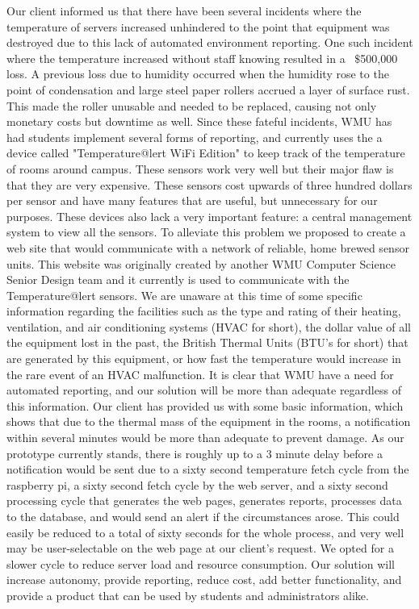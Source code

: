 \documentclass{report}
\begin{document}
\newline
\indent
Our client informed us that there have been several incidents where the temperature of servers increased unhindered to the point that equipment was destroyed due to this lack of automated environment reporting. One such incident where the temperature increased without staff knowing resulted in a ~$\$$500,000 loss. A previous loss due to humidity occurred when the humidity rose to the point of condensation and large steel paper rollers accrued a layer of surface rust. This made the roller unusable and needed to be replaced, causing not only monetary costs but downtime as well.
\newline
\indent
Since these fateful incidents, WMU has had students implement several forms of reporting, and currently uses the a device called "Temperature@lert WiFi Edition" to keep track of the temperature of rooms around campus. These sensors work very well but their major flaw is that they are very expensive. These sensors cost upwards of three hundred dollars per sensor and have many features that are useful, but unnecessary for our purposes. These devices also lack a very important feature: a central management system to view all the sensors. To alleviate this problem we proposed to create a web site that would communicate with a network of reliable, home brewed sensor units. This website was originally created by another WMU Computer Science Senior Design team and it currently is used to communicate with the Temperature@lert sensors.
\newline
\indent  
We are unaware at this time of some specific information regarding the facilities such as the type and rating of their heating, ventilation, and air conditioning systems (HVAC for short), the dollar value of all the equipment lost in the past, the British Thermal Units (BTU’s for short) that are generated by this equipment, or how fast the temperature would increase in the rare event of an HVAC malfunction. It is clear that WMU have a need for automated reporting, and our solution will be more than adequate regardless of this information. Our client has provided us with some basic information, which shows that due to the thermal mass of the equipment in the rooms, a notification within several minutes would be more than adequate to prevent damage. As our prototype currently stands, there is roughly up to a 3 minute delay before a notification would be sent due to a sixty second temperature fetch cycle from the raspberry pi, a sixty second fetch cycle by the web server, and a sixty second processing cycle that generates the web pages, generates reports, processes data to the database, and would send an alert if the circumstances arose. This could easily be reduced to a total of sixty seconds for the whole process, and very well may be user-selectable on the web page at our client's request. We opted for a slower cycle to reduce server load and resource consumption. Our solution will increase autonomy, provide reporting, reduce cost, add better functionality, and provide a product that can be used by students and administrators alike.
\end{document}
